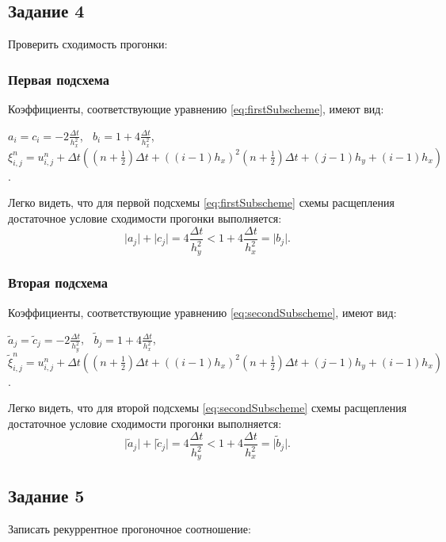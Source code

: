 \documentclass[12pt, a4paper]{report}
\begin{document}
	\subsection*{Задание 4}
	\large
	Проверить сходимость прогонки:
	\subsubsection*{Первая подсхема}
	\large
	Коэффициенты, соответствующие уравнению \eqref{eq:firstSubscheme}, имеют вид:
	\small
	\begin{center}
		$a_{i}=c_{i}=-2\frac{\Delta t}{h_{x}^{2}}$, $\>$ $b_{i}=1 + 4\frac{\Delta t}{h_{x}^{2}}$, $\>$ $\xi_{i, j}^{n}=u_{i, j}^{n} + \Delta t((n + \frac{1}{2})\Delta t + ((i - 1)h_{x})^{2}(n + \frac{1}{2})\Delta t + (j - 1)h_{y} + (i - 1)h_{x})$.
	\end{center}
	\par
	\large
	Легко видеть, что для первой подсхемы \eqref{eq:firstSubscheme} схемы расщепления достаточное условие сходимости прогонки выполняется:
	\begin{equation*}
		\lvert a_{j} \rvert + \lvert c_{j} \rvert = 4\frac{\Delta t}{h_{y}^{2}} < 1 + 4\frac{\Delta t}{h_{x}^{2}} = \lvert b_{j} \rvert.
	\end{equation*}
	\subsubsection*{Вторая подсхема}
	\large
	Коэффициенты, соответствующие уравнению \eqref{eq:secondSubscheme}, имеют вид:
	\small
	\begin{center}
		$\tilde{a}_{j}=\tilde{c}_{j}=-2\frac{\Delta t}{h_{y}^{2}}$, $\>$ $\tilde{b}_{j}=1 + 4\frac{\Delta t}{h_{x}^{2}}$, $\>$ $\tilde{\xi}_{i, j}^{n}=u_{i, j}^{n} + \Delta t((n + \frac{1}{2})\Delta t + ((i - 1)h_{x})^{2}(n + \frac{1}{2})\Delta t + (j - 1)h_{y} + (i - 1)h_{x})$.
	\end{center}
	\par
	\large
	Легко видеть, что для второй подсхемы \eqref{eq:secondSubscheme} схемы расщепления достаточное условие сходимости прогонки выполняется:
	\begin{equation*}
		\lvert \tilde{a}_{j} \rvert + \lvert \tilde{c}_{j} \rvert = 4\frac{\Delta t}{h_{y}^{2}} < 1 + 4\frac{\Delta t}{h_{x}^{2}} = \lvert \tilde{b}_{j} \rvert.
	\end{equation*}

	\subsection*{Задание 5}
	\large
	Записать рекуррентное прогоночное соотношение:
\end{document}
